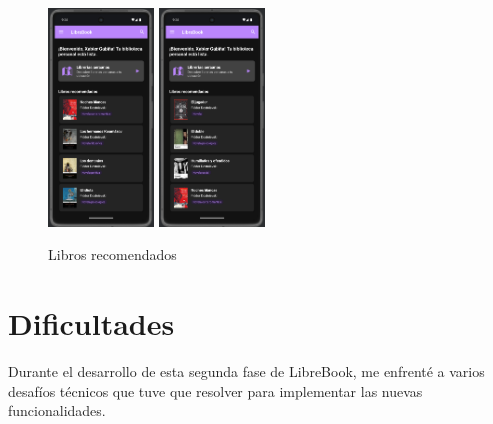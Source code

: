 \documentclass[a4paper,11pt]{report}
\begin{document}
      \begin{figure}[H]
        \centering
        \includegraphics[width=0.25\textwidth]{.img/libros_recomendados_1.png}
        \hspace{2cm}
        \includegraphics[width=0.25\textwidth]{.img/libros_recomendados_2.png}
        \caption{Libros recomendados}
        \label{fig:libros-recomendados}
      \end{figure}
  \chapter{Dificultades}
    Durante el desarrollo de esta segunda fase de LibreBook, me enfrenté a varios desafíos técnicos que tuve que resolver para implementar las nuevas funcionalidades.
\end{document}
